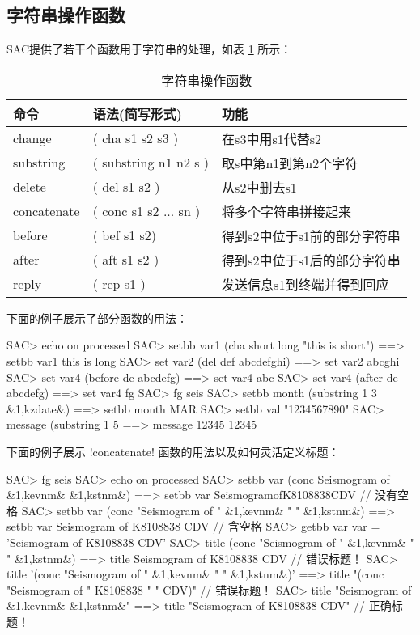 \subsection{字符串操作函数}
SAC提供了若干个函数用于字符串的处理，如表 \ref{table:string-operation-functions}
所示：
\begin{table}[!ht]
\centering
\ttfamily
\small
\caption{字符串操作函数}
\label{table:string-operation-functions}
\begin{tabular}{lll}
    \toprule
    命令        &   语法(简写形式)          &   功能    \\
    \midrule
    change      &   ( cha s1 s2 s3 )        &   在s3中用s1代替s2    \\
    substring   &   ( substring n1 n2 s )   &   取s中第n1到第n2个字符\\
    delete      &   ( del s1 s2 )           &   从s2中删去s1    \\
    concatenate &   ( conc s1 s2 ... sn )   &   将多个字符串拼接起来 \\
    before      &   ( bef s1 s2)            &   得到s2中位于s1前的部分字符串\\
    after       &   ( aft s1 s2 )           &   得到s2中位于s1后的部分字符串\\
    reply       &   ( rep s1 )              &   发送信息s1到终端并得到回应  \\
    \bottomrule
\end{tabular}
\end{table}

下面的例子展示了部分函数的用法：
\begin{SACCode}
SAC> echo on processed
SAC> setbb var1 (cha short long "this is short")
 ==>  setbb var1 this is long
SAC> set var2 (del def abcdefghi)
 ==>  set var2 abcghi
SAC> set var4 (before de abcdefg)
 ==>  set var4 abc
SAC> set var4 (after de abcdefg)
 ==>  set var4 fg
SAC> fg seis
SAC> setbb month (substring 1 3 &1,kzdate&)
 ==>  setbb month MAR
SAC> setbb val "1234567890"
SAC> message (substring 1 5 %
 ==>  message 12345
 12345
\end{SACCode}

下面的例子展示 !concatenate! 函数的用法以及如何灵活定义标题：
\begin{SACCode}
SAC> fg seis
SAC> echo on processed
SAC> setbb var (conc Seismogram of &1,kevnm& &1,kstnm&)
 ==>  setbb var SeismogramofK8108838CDV                 // 没有空格
SAC> setbb var (conc "Seismogram of " &1,kevnm& " " &1,kstnm&)
 ==>  setbb var Seismogram of K8108838 CDV              // 含空格
SAC> getbb var
 var = 'Seismogram of K8108838 CDV'
SAC> title (conc "Seismogram of " &1,kevnm& " " &1,kstnm&)
 ==>  title Seismogram of K8108838 CDV                  // 错误标题！
SAC> title '(conc "Seismogram of " &1,kevnm& " " &1,kstnm&)'
 ==>  title "(conc "Seismogram of " K8108838 " " CDV)"  // 错误标题！
SAC> title "Seismogram of &1,kevnm& &1,kstnm&"
 ==>  title "Seismogram of K8108838 CDV"                // 正确标题！
\end{SACCode}

